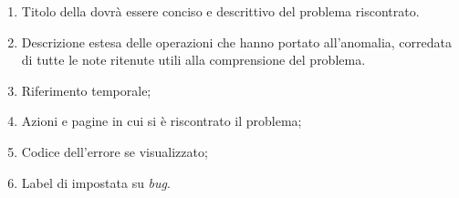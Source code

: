 \begin{enumerate}
		\begin{enumerate}
			\item Titolo della  dovrà essere conciso e descrittivo del problema riscontrato. 
			\item Descrizione estesa delle operazioni che hanno portato all'anomalia, corredata di tutte le note ritenute utili alla comprensione del problema.
			\item Riferimento temporale;
			\item Azioni e pagine in cui si è riscontrato il problema;
			\item Codice dell'errore se visualizzato;
			\item Label di  impostata su \emph{bug}.
		\end{enumerate}

	\end{enumerate}